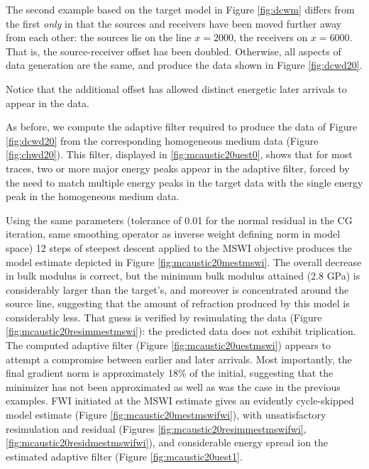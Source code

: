 The second example based on the target model in Figure \ref{fig:dcwm}
differs from the first {\em only} in that the sources and receivers
have been moved further away from each other: the sources lie on the
line $x=2000$, the receivers on $x=6000$. That is, the source-receiver
offset has been doubled. Otherwise, all aspects of data generation are
the same, and produce the data shown in Figure \ref{fig:dcwd20}.


Notice that the additional offset has allowed distinct energetic later
arrivals to appear in the data.

As before, we compute the adaptive filter required to produce the data
of Figure \ref{fig:dcwd20} from the corresponding homogeneous medium data (Figure
\ref{fig:chwd20}). This filter, displayed in \ref{fig:mcaustic20uest0},
shows that for most traces, two or more major energy peaks appear in the
adaptive filter, forced by the need to match multiple energy peaks in
the target data with the single energy peak in the homogeneous medium
data.

Using the same parameters (tolerance of 0.01 for the normal residual
in the CG iteration, same smoothing operator as inverse weight
defining norm in model space) 12 steps of steepest descent applied to
the MSWI objective produces the model
estimate depicted in Figure \ref{fig:mcaustic20mestmswi}. The overall
decrease in bulk modulus is correct, but the minimum bulk modulus attained (2.8 GPa) is considerably larger
than the target's, and moreover is concentrated around the source
line, suggesting that the amount of refraction produced by this model is
considerably less. That guess is verified by resimulating the data
(Figure \ref{fig:mcaustic20resimmestmswi}): the predicted data does not
exhibit triplication. The computed adaptive filter (Figure 
\ref{fig:mcaustic20uestmswi}) appears to attempt a compromise between
earlier and later arrivals. Most importantly, the final gradient norm
is approximately 18\% of the initial, suggesting that the minimizer has
not been approximated as well as was the case in the previous
examples. FWI initiated at the MSWI estimate gives an evidently
cycle-skipped model estimate (Figure \ref{fig:mcaustic20mestmswifwi}),
with unsatisfactory resimulation and residual (Figures
\ref{fig:mcaustic20resimmestmswifwi},
\ref{fig:mcaustic20residmestmswifwi}), and considerable energy spread
ion the estimated adaptive filter (Figure \ref{fig:mcaustic20uest1}.


